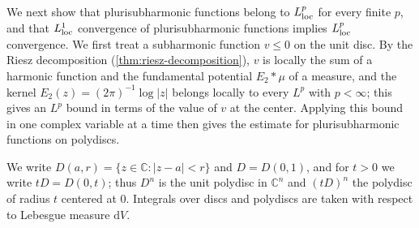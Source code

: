 We next show that plurisubharmonic functions belong to $L^p_{\mathrm{loc}}$ for every finite $p$, and that $L^1_{\mathrm{loc}}$ convergence of plurisubharmonic functions implies $L^p_{\mathrm{loc}}$ convergence. We first treat a subharmonic function $v\leq0$ on the unit disc. By the Riesz decomposition (\cref{thm:riesz-decomposition}), $v$ is locally the sum of a harmonic function and the fundamental potential $E_2*\mu$ of a measure, and the kernel $E_2(z)=(2\pi)^{-1}\log|z|$ belongs locally to every $L^p$ with $p<\infty$; this gives an $L^p$ bound in terms of the value of $v$ at the center. Applying this bound in one complex variable at a time then gives the estimate for plurisubharmonic functions on polydiscs.

We write $D(a,r)=\{z\in\mathbb C:|z-a|<r\}$ and $D=D(0,1)$, and for $t>0$ we write $tD=D(0,t)$; thus $D^n$ is the unit polydisc in $\mathbb C^n$ and $(tD)^n$ the polydisc of radius $t$ centered at $0$. Integrals over discs and polydiscs are taken with respect to Lebesgue measure $\mathrm dV$.

